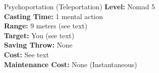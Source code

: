 {Psychoportation (Teleportation)}
{
	\textbf{Level:}
	Nomad 5\\
	\textbf{Casting Time:}
	1 mental action\\
	\textbf{Range:}
	9 meters (see text)\\
	\textbf{Target:}
	You (see text)\\
	\textbf{Saving Throw:}
	None\\
	\textbf{Cost:}
	See text\\
	\textbf{Maintenance Cost:}
	None (Instantaneous)\\
}
